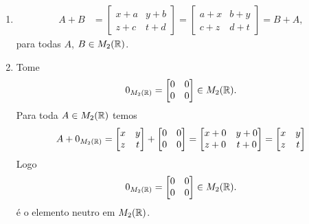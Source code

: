 \documentclass[12pt]{exam}
\begin{document}
\begin{enumerate}[label={\roman*})]
    \item 
    \begin{align*}
        A + B &= 
        \begin{bmatrix}
            x + a & y + b\\z + c & t + d 
        \end{bmatrix} = \begin{bmatrix}
            a + x & b + y\\c + z & d + t
        \end{bmatrix} = B + A,
    \end{align*}
    para todas $A$, $B \in M_2(\mathbb{R})$.

    \item Tome
    \[
        0_{M_2(\mathbb{R})} = \begin{bmatrix}
            0 & 0\\0 & 0
        \end{bmatrix} \in M_2(\mathbb{R}).
    \]
    Para toda $A \in M_2(\mathbb{R})$ temos
    \begin{align}
        A + 0_{M_2(\mathbb{R})} = \begin{bmatrix}
        x & y\\
        z & t
    \end{bmatrix} + \begin{bmatrix}
        0 & 0\\
        0 & 0
    \end{bmatrix} = \begin{bmatrix}
        x + 0& y + 0\\
        z + 0& t + 0
    \end{bmatrix} = \begin{bmatrix}
        x & y\\
        z & t
    \end{bmatrix}
    \end{align}
    Logo
    \[
        0_{M_2(\mathbb{R})} = \begin{bmatrix}
            0 & 0\\0 & 0
        \end{bmatrix} \in M_2(\mathbb{R}).
    \]
    \'e o elemento neutro em $M_2(\mathbb{R})$.


\end{enumerate}
\end{document}
